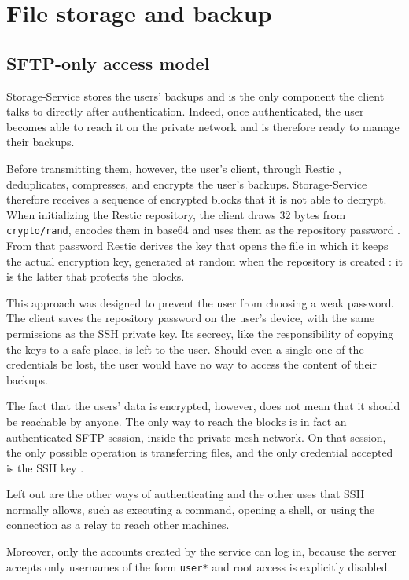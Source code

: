 \chapter{File storage and backup}
\label{chap:storage}

\section{SFTP-only access model}

Storage-Service stores the users' backups and is the only component the client talks to
directly after authentication.
Indeed, once authenticated, the user becomes able to reach it on the private network
and is therefore ready to manage their backups.

Before transmitting them, however, the user's client, through Restic \cite{restic-github}, deduplicates, compresses, and
encrypts the user's backups. Storage-Service therefore receives a sequence of encrypted blocks that it is not
able to decrypt.
When initializing the Restic repository, the client draws 32 bytes from \texttt{crypto/rand},
encodes them in base64 and uses them as the repository password \cite{ramusb-code-reposecret}.
From that password Restic derives the key that opens the file in which it keeps the actual encryption key,
generated at random when the repository is created \cite{restic-design}: it is the latter that protects the blocks.

This approach was designed to prevent the user from choosing a weak
password. The client saves the repository password on the user's device, with the same
permissions as the SSH private key. Its secrecy, like the responsibility of copying the keys to
a safe place, is left to the user. Should even a single one of the
credentials be lost, the user would have no way to access the content of their backups.

The fact that the users' data is encrypted, however, does not mean that it should be reachable by
anyone.
The only way to reach the blocks is in fact an authenticated SFTP session, inside the private
mesh network. On that session, the only possible operation is transferring files, and the only credential
accepted is the SSH key \cite{openssh-sshd-config}.

Left out are the other ways of authenticating and the other uses that SSH normally allows, such as executing a command,
opening a shell, or using the connection as a relay to reach other machines.

Moreover, only the accounts created by the service can log in, because the server accepts only
usernames of the form \texttt{user*} and root access is explicitly disabled.

